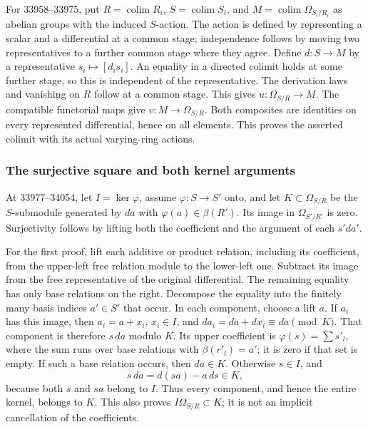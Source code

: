 For 33958--33975, put \(R=\operatorname{colim}R_i\), \(S=\operatorname{colim}S_i\), and \(M=\operatorname{colim}\Omega_{S_i/R_i}\) as abelian groups with the induced \(S\)-action. The action is defined by representing a scalar and a differential at a common stage; independence follows by moving two representatives to a further common stage where they agree. Define \(d:S\to M\) by a representative \(s_i\mapsto[d_i s_i]\). An equality in a directed colimit holds at some further stage, so this is independent of the representative. The derivation laws and vanishing on \(R\) follow at a common stage. This gives \(u:\Omega_{S/R}\to M\). The compatible functorial maps give \(v:M\to\Omega_{S/R}\). Both composites are identities on every represented differential, hence on all elements. This proves the asserted colimit with its actual varying-ring actions.

\subsubsection{The surjective square and both kernel arguments}\label{the-surjective-square-and-both-kernel-arguments}

At 33977--34054, let \(I=\ker\varphi\), assume \(\varphi:S\to S'\) onto, and let \(K\subset\Omega_{S/R}\) be the \(S\)-submodule generated by \(da\) with \(\varphi(a)\in\beta(R')\). Its image in \(\Omega_{S'/R'}\) is zero. Surjectivity follows by lifting both the coefficient and the argument of each \(s'da'\).

For the first proof, lift each additive or product relation, including its coefficient, from the upper-left free relation module to the lower-left one. Subtract its image from the free representative of the original differential. The remaining equality has only base relations on the right. Decompose the equality into the finitely many basis indices \(a'\in S'\) that occur. In each component, choose a lift \(a\). If \(a_i\) has this image, then \(a_i=a+x_i\), \(x_i\in I\), and \(da_i=da+dx_i\equiv da\pmod K\). That component is therefore \(s\,da\) modulo \(K\). Its upper coefficient is \(\varphi(s)=\sum s'_l\), where the sum runs over base relations with \(\beta(r'_l)=a'\); it is zero if that set is empty. If such a base relation occurs, then \(da\in K\). Otherwise \(s\in I\), and \[
s\,da=d(sa)-a\,ds\in K,
\] because both \(s\) and \(sa\) belong to \(I\). Thus every component, and hence the entire kernel, belongs to \(K\). This also proves \(I\Omega_{S/R}\subset K\); it is not an implicit cancellation of the coefficients.

